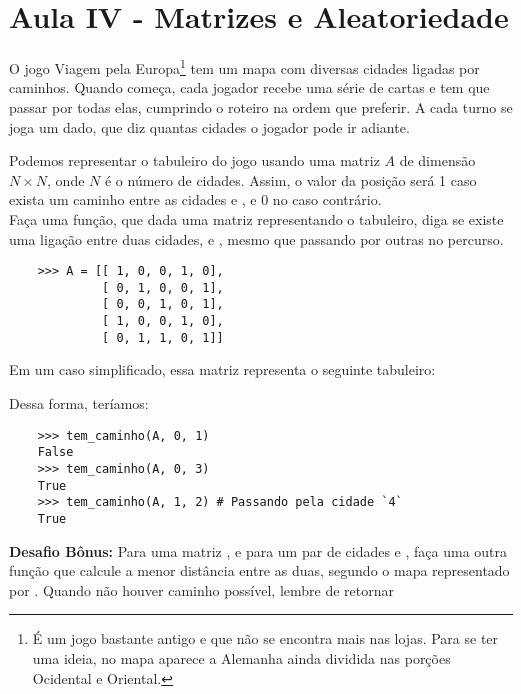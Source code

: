         \section{Aula IV - Matrizes e Aleatoriedade}
        
        
        O jogo Viagem pela Europa\footnote{É um jogo bastante antigo e que não se encontra mais nas lojas. Para se ter uma ideia, no mapa aparece a Alemanha ainda dividida nas porções Ocidental e Oriental.} tem um mapa com diversas cidades ligadas por caminhos. Quando começa, cada jogador recebe uma série de cartas e tem que passar por todas elas, cumprindo o roteiro na ordem que preferir. A cada turno se joga um dado, que diz quantas cidades o jogador pode ir adiante.
        
        
        Podemos representar o tabuleiro do jogo usando uma matriz $A$ de dimensão $N \times N$, onde $N$ é o número de cidades. Assim, o valor da posição  será 1 caso exista um caminho entre as cidades  e , e 0 no caso contrário.\\
        
        \quest Faça uma função, que dada uma matriz  representando o tabuleiro, diga se existe uma ligação entre duas cidades,  e , mesmo que passando por outras no percurso.\\
    
        \example
        \begin{lstlisting}
    >>> A = [[ 1, 0, 0, 1, 0],
             [ 0, 1, 0, 0, 1],
             [ 0, 0, 1, 0, 1],
             [ 1, 0, 0, 1, 0],
             [ 0, 1, 1, 0, 1]]
        \end{lstlisting}
        
        Em um caso simplificado, essa matriz representa o seguinte tabuleiro:
        
        
        
        Dessa forma, teríamos:
        \begin{lstlisting}
    >>> tem_caminho(A, 0, 1)
    False
    >>> tem_caminho(A, 0, 3)
    True
    >>> tem_caminho(A, 1, 2) # Passando pela cidade `4`
    True
        \end{lstlisting}
    
        \textbf{Desafio Bônus:} Para uma matriz , e para um par de cidades  e , faça uma outra função que calcule a menor distância entre as duas, segundo o mapa representado por . Quando não houver caminho possível, lembre de retornar \\
        
